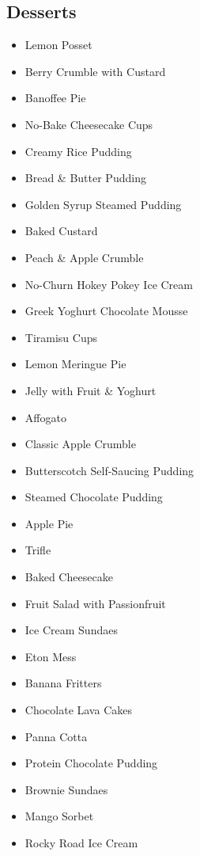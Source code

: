 \subsection*{Desserts}
\begin{itemize}
  \item \todo Lemon Posset 
  \item \todo Berry Crumble with Custard
  \item \todo Banoffee Pie 
  \item \todo No-Bake Cheesecake Cups
  \item \todo Creamy Rice Pudding
  \item \todo Bread \& Butter Pudding
  \item \todo Golden Syrup Steamed Pudding 
  \item \todo Baked Custard
  \item \todo Peach \& Apple Crumble
  \item \todo No-Churn Hokey Pokey Ice Cream
  \item \todo Greek Yoghurt Chocolate Mousse
  \item \todo Tiramisu Cups
  \item \todo Lemon Meringue Pie
  \item \todo Jelly with Fruit \& Yoghurt
  \item \todo Affogato
  \item \todo Classic Apple Crumble
  \item \todo Butterscotch Self-Saucing Pudding
  \item \todo Steamed Chocolate Pudding
  \item \todo Apple Pie
  \item \todo Trifle 
  \item \todo Baked Cheesecake
\end{itemize}

\begin{itemize}
  \item \todo Fruit Salad with Passionfruit
  \item \todo Ice Cream Sundaes
  \item \todo Eton Mess
  \item \todo Banana Fritters
  \item \todo Chocolate Lava Cakes
  \item \todo Panna Cotta
  \item \todo Protein Chocolate Pudding
  \item \todo Brownie Sundaes
\end{itemize}

\begin{itemize}
  \item \todo Mango Sorbet
  \item \todo Rocky Road Ice Cream
\end{itemize}
